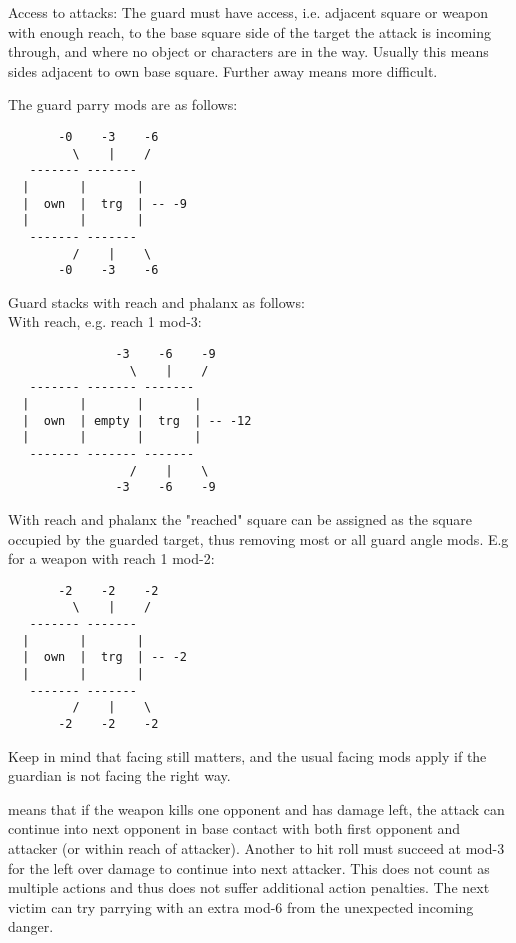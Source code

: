 Access to attacks: The guard must have access, i.e. adjacent square or weapon with enough reach, to the base square side of the target the attack is incoming through, and where no object or characters are in the way. Usually this means sides adjacent to own base square. Further away means more difficult.

The guard parry mods are as follows:
\begin{samepage} \small \begin{verbatim}
       -0    -3    -6
         \    |    /
   ------- -------
  |       |       |
  |  own  |  trg  | -- -9
  |       |       |
   ------- -------
         /    |    \
       -0    -3    -6
\end{verbatim} \normalsize \end{samepage}

Guard stacks with reach and phalanx as follows:\\
With reach, e.g. reach 1 mod-3:
\begin{samepage} \small \begin{verbatim}
               -3    -6    -9
                 \    |    /
   ------- ------- -------
  |       |       |       |
  |  own  | empty |  trg  | -- -12
  |       |       |       |
   ------- ------- -------
                 /    |    \
               -3    -6    -9
\end{verbatim} \normalsize \end{samepage}

With reach and phalanx the "reached" square can be assigned as the square occupied by the guarded target, thus removing most or all guard angle mods. E.g for a weapon with reach 1 mod-2:
\begin{samepage} \small \begin{verbatim}
       -2    -2    -2
         \    |    /
   ------- -------
  |       |       |
  |  own  |  trg  | -- -2
  |       |       |
   ------- -------
         /    |    \
       -2    -2    -2
\end{verbatim} \normalsize \end{samepage}

Keep in mind that facing still matters, and the usual facing mods apply if the guardian is not facing the right way.


\skill{Maneuver (cost 10) "sweep":} means that if the weapon kills one opponent and has damage left, the attack can continue into next opponent in base contact with both first opponent and attacker (or within reach of attacker). Another to hit roll must succeed at mod-3 for the left over damage to continue into next attacker. This does not count as multiple actions and thus does not suffer additional action penalties. The next victim can try parrying with an extra mod-6 from the unexpected incoming danger.


